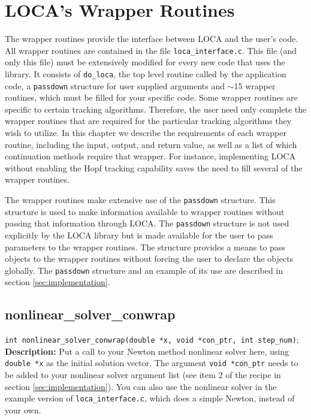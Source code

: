 \chapter{LOCA's Wrapper Routines}
\label{ch:wrappers}

The wrapper routines provide the interface between LOCA and the user's code. All wrapper routines are contained in the file \texttt{loca\_interface.c}.  This file (and only this file) must be extensively modified for every new code that uses the library. It consists of \texttt{do\_loca}, the top level routine called by the application code, a \texttt{passdown} structure for user supplied arguments and $\sim$15 wrapper routines, which must be filled for your specific code. Some wrapper routines are specific to certain tracking algorithms.  Therefore, the user need only complete the wrapper routines that are required for the particular tracking algorithms they wish to utilize.  In this chapter we describe the requirements of each wrapper routine, including the input, output, and return value, as well as a list of which continuation methods require that wrapper. For instance, implementing LOCA without enabling the Hopf tracking capability saves the need to fill several of the wrapper routines.

The wrapper routines make extensive use of the \texttt{passdown} structure. This structure is used to make information available to wrapper routines without passing that information through LOCA. The \texttt{passdown} structure is not used explicitly by the LOCA library but is made available for the user to pass parameters to the wrapper routines. The structure provides a means to pass objects to the wrapper routines without forcing the user to declare the objects globally.  The \texttt{passdown} structure and an example of its use are described in section \ref{sec:implementation}.


\section{nonlinear\_solver\_conwrap}
\texttt{int nonlinear\_solver\_conwrap(double *x, void *con\_ptr, int step\_num)}; \\

{\bf Description:} Put a call to your Newton method nonlinear solver here, using \texttt{double *x} as the initial solution vector. The argument \texttt{void *con\_ptr} needs to be added to your nonlinear solver argument list (see item 2 of the recipe in section \ref{sec:implementation}). You can also use the nonlinear solver in the example version of \texttt{loca\_interface.c}, which does a simple Newton, instead of your own. \\

